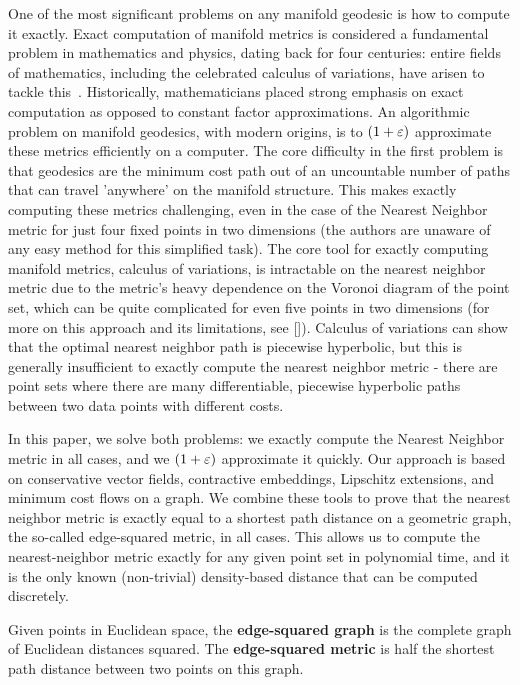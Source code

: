 One of the most significant problems on any manifold geodesic is how to
compute it exactly. Exact computation of manifold metrics is considered a
fundamental problem in mathematics and physics, dating back for four
centuries: entire fields of mathematics, including the celebrated calculus
of variations, have arisen to tackle this~\cite{}. Historically,
mathematicians placed strong emphasis on exact computation as opposed to
constant factor approximations. An algorithmic problem on manifold
geodesics, with modern origins, is to $(1+\varepsilon)$ approximate these metrics
efficiently on a computer. The core difficulty in the first problem is that
geodesics are the minimum cost path out of an uncountable number of paths
that can travel 'anywhere' on the manifold structure. This makes exactly
computing these metrics challenging, even in the case of the Nearest
Neighbor metric for just four fixed points in two dimensions (the authors
are unaware of any easy method for this simplified task). 
The core tool for exactly
computing manifold metrics, calculus of variations, is intractable on the
nearest neighbor metric due to the metric's heavy dependence on the Voronoi
diagram of the point set, which can be quite complicated for even five
points in two dimensions (for more on this approach and its limitations,
see []). Calculus of variations can show that the optimal nearest neighbor
path is piecewise hyperbolic, but this is generally insufficient to exactly
compute the nearest neighbor metric - there are point sets where there are
many differentiable, piecewise hyperbolic paths between two data points with
different costs.


In this paper, we solve both problems: we exactly compute the Nearest
Neighbor metric in all cases, and we $(1+\varepsilon)$ approximate it quickly.
Our approach is
based on conservative vector fields, contractive embeddings, Lipschitz
extensions, and minimum cost
flows on a graph. We combine these tools to prove that the nearest neighbor
metric is exactly equal to a shortest path distance on a geometric graph,
the so-called edge-squared metric, in all cases. This allows us to compute
the nearest-neighbor metric exactly for any given point set in polynomial
time, and it is the only known (non-trivial) density-based distance that can be computed
discretely.


\begin{definition} Given points in Euclidean space, the
\textbf{edge-squared graph} is the complete graph of Euclidean distances
squared. The \textbf{edge-squared metric} is half the shortest path distance
between two points on this graph. \end{definition}

